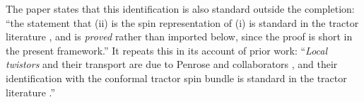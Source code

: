 The paper states that this identification is also standard outside the completion: ``the statement that (ii) is the spin representation of (i) is standard in the tractor literature \cite{BEG1994, CurryGover2018}, and is \emph{proved} rather than imported below, since the proof is short in the present framework.'' It repeats this in its account of prior work: ``\emph{Local twistors} and their transport are due to Penrose and collaborators \cite{PenroseMacCallum73, Dighton74}, and their identification with the conformal tractor spin bundle is standard in the tractor literature \cite{BEG1994, CurryGover2018}.''
